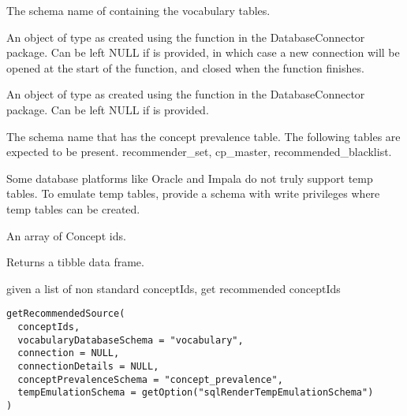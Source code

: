 \documentclass[a4paper]{book}
\begin{document}
%
\begin{Arguments}
\begin{ldescription}
\item[\code{vocabularyDatabaseSchema}] The schema name of containing the vocabulary tables.

\item[\code{connection}] An object of type  as created using the
 function in the
DatabaseConnector package. Can be left NULL if 
is provided, in which case a new connection will be opened at the start
of the function, and closed when the function finishes.

\item[\code{connectionDetails}] An object of type  as created using the
 function in the
DatabaseConnector package. Can be left NULL if  is
provided.

\item[\code{conceptPrevalenceSchema}] The schema name that has the concept prevalence table. The following
tables are expected to be present. recommender\_set,
cp\_master, recommended\_blacklist.

\item[\code{tempEmulationSchema}] Some database platforms like Oracle and Impala do not truly support temp tables. To emulate temp 
tables, provide a schema with write privileges where temp tables can be created.

\item[\code{conceptIds}] An array of Concept ids.
\end{ldescription}
\end{Arguments}
%
\begin{Value}
Returns a tibble data frame.
\end{Value}
%
\begin{Description}\relax
given a list of non standard conceptIds, get recommended conceptIds
\end{Description}
%
\begin{Usage}
\begin{verbatim}
getRecommendedSource(
  conceptIds,
  vocabularyDatabaseSchema = "vocabulary",
  connection = NULL,
  connectionDetails = NULL,
  conceptPrevalenceSchema = "concept_prevalence",
  tempEmulationSchema = getOption("sqlRenderTempEmulationSchema")
)
\end{verbatim}
\end{Usage}
\end{document}
